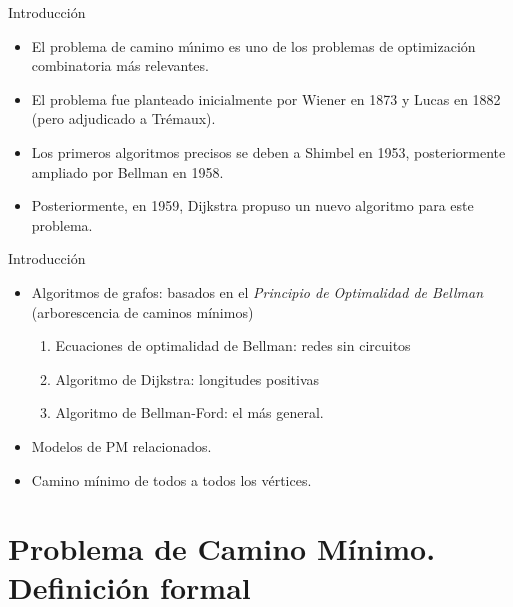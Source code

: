 \documentclass[aspectratio=169]{beamer}
\begin{document}
\begin{frame}{Introducción}
\begin{itemize}\itemsep 4mm
	\item El problema de camino m\'{\i}nimo es uno de los problemas de
	optimizaci\'{o}n combinatoria m\'{a}s relevantes.
	\item El problema fue planteado inicialmente por Wiener en 1873 y Lucas en 1882 (pero
	adjudicado a Tr\'{e}maux).
	\item Los primeros algoritmos precisos se deben a Shimbel  en 1953, posteriormente ampliado por
	Bellman en 1958.
	\item Posteriormente, en 1959, Dijkstra propuso un nuevo
	algoritmo para este problema.
\end{itemize}
\end{frame}


\begin{frame}{Introducción}

\begin{itemize} \itemsep 4mm
\item Algoritmos de grafos: basados en el {\it Principio de Optimalidad de Bellman} (arborescencia de caminos mínimos)
\begin{enumerate}
  \item Ecuaciones de optimalidad de Bellman: redes sin circuitos
  \item Algoritmo de Dijkstra: longitudes positivas
  \item  Algoritmo de Bellman-Ford: el más general.
\end{enumerate}
\item Modelos de PM relacionados.
\item Camino mínimo de todos a todos los vértices.
\end{itemize}

\end{frame}

\section{Problema de Camino Mínimo. Definición formal}
\end{document}
